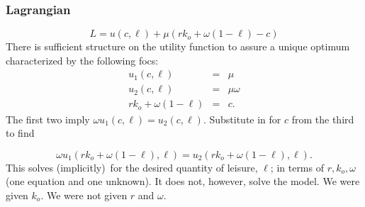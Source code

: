 \documentclass[aspectratio=169]{ltx-talk}
\begin{document}
\begin{frame}
\frametitle{Lagrangian }
\begin{equation*}
L=u(c,\ell )+\mu \left( rk_{o}+\omega \left( 1-\ell \right) -c\right)
\end{equation*}%
There is sufficient structure on the utility function to assure a unique
optimum characterized by the following focs:%
\begin{eqnarray*}
u_{1}(c,\ell ) &=&\mu \\
u_{2}(c,\ell ) &=&\mu \omega \\
rk_{o}+\omega \left( 1-\ell \right) &=&c.
\end{eqnarray*}%
The first two imply $\omega u_{1}(c,\ell )=u_{2}(c,\ell ).$ Substitute in
for $c$ from the third to find

\begin{equation*}
\omega u_{1}(rk_{o}+\omega \left( 1-\ell \right) ,\ell )=u_{2}(rk_{o}+\omega
\left( 1-\ell \right) ,\ell ).
\end{equation*}%
This solves (implicitly)\ for the desired quantity of leisure, $\ell $; in
terms of $r,k_{o},\omega $ (one equation and one unknown). It does not,
however, solve the model. We were given $k_{o}.$ We were not given $r$ and $%
\omega .$
\end{frame}
\end{document}
